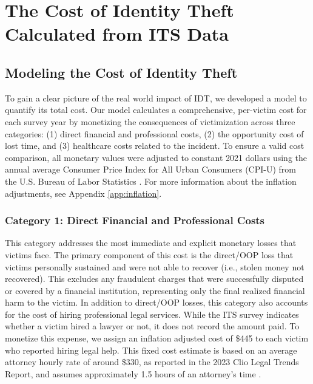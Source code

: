 
\section{The Cost of Identity Theft Calculated from ITS Data}
\label{sec:comprehensive_cost_of_IDT}

\subsection{Modeling the Cost of Identity Theft}

To gain a clear picture of the real world impact of IDT, we developed a model to quantify its total cost. Our model calculates a comprehensive, per-victim cost for each survey year by monetizing the consequences of victimization across three categories: (1) direct financial and professional costs, (2) the opportunity cost of lost time, and (3) healthcare costs related to the incident. To ensure a valid cost comparison, all monetary values were adjusted to constant 2021 dollars using the annual average Consumer Price Index for All Urban Consumers (CPI-U) from the U.S. Bureau of Labor Statistics \cite{BLS_CPI, USInflationCalc_CPI}. For more information about the inflation adjustments, see Appendix \ref{app:inflation}.

\subsubsection{Category 1: Direct Financial and Professional Costs}
This category addresses the most immediate and explicit monetary losses that victims face. The primary component of this cost is the  direct/OOP loss that victims personally sustained and were not able to recover (i.e., stolen money not recovered). This excludes any fraudulent charges that were successfully disputed or covered by a financial institution, representing only the final realized financial harm to the victim. In addition to direct/OOP losses, this category also accounts for the cost of hiring professional legal services. While the ITS survey indicates whether a victim hired a lawyer or not, it does not record the amount paid. To monetize this expense, we assign an inflation adjusted cost of \$445 to each victim who reported hiring legal help. This fixed cost estimate is based on an average attorney hourly rate of around \$330, as reported in the 2023 Clio Legal Trends Report, and assumes approximately 1.5 hours of an attorney's time \cite{USNews_Lawyer}.

